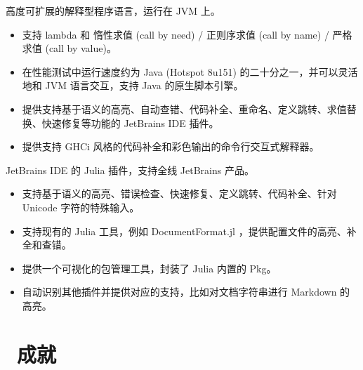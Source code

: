 \documentclass{resume}
\begin{document}
高度可扩展的解释型程序语言，运行在 JVM 上。
\begin{itemize}
  \item 支持 lambda 和 惰性求值 (call by need) / 正则序求值 (call by name) / 严格求值 (call by value)。
  \item 在性能测试中运行速度约为 Java (Hotspot 8u151) 的二十分之一，并可以灵活地和 JVM 语言交互，支持 Java 的原生脚本引擎。
  \item 提供支持基于语义的高亮、自动查错、代码补全、重命名、定义跳转、求值替换、快速修复等功能的 JetBrains IDE 插件。
  \item 提供支持 GHCi 风格的代码补全和彩色输出的命令行交互式解释器。
\end{itemize}

JetBrains IDE 的 Julia 插件，支持全线 JetBrains 产品。
\begin{itemize}
  \item 支持基于语义的高亮、错误检查、快速修复、定义跳转、代码补全、针对 Unicode 字符的特殊输入。
  \item 支持现有的 Julia 工具，例如 DocumentFormat.jl ，提供配置文件的高亮、补全和查错。
  \item 提供一个可视化的包管理工具，封装了 Julia 内置的 Pkg。
  \item 自动识别其他插件并提供对应的支持，比如对文档字符串进行 Markdown 的高亮。
\end{itemize}


\section{\faHeartO\ 成就}
\end{document}
